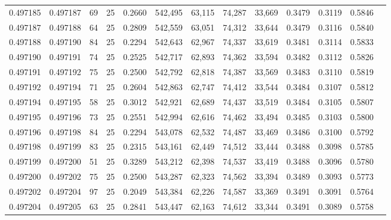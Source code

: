 \begin{tabular}{rrrrrrrrrrrrr}
0.497185 & 0.497187 &    69 &  25 &                                     0.2660 & 542,495 &  63,115 &  74,287 &  33,669 & 0.3479 & 0.3119 & 0.5846 \\
0.497187 & 0.497188 &    64 &  25 &                                     0.2809 & 542,559 &  63,051 &  74,312 &  33,644 & 0.3479 & 0.3116 & 0.5840 \\
0.497188 & 0.497190 &    84 &  25 &                                     0.2294 & 542,643 &  62,967 &  74,337 &  33,619 & 0.3481 & 0.3114 & 0.5833 \\
0.497190 & 0.497191 &    74 &  25 &                                     0.2525 & 542,717 &  62,893 &  74,362 &  33,594 & 0.3482 & 0.3112 & 0.5826 \\
0.497191 & 0.497192 &    75 &  25 &                                     0.2500 & 542,792 &  62,818 &  74,387 &  33,569 & 0.3483 & 0.3110 & 0.5819 \\
0.497192 & 0.497194 &    71 &  25 &                                     0.2604 & 542,863 &  62,747 &  74,412 &  33,544 & 0.3484 & 0.3107 & 0.5812 \\
0.497194 & 0.497195 &    58 &  25 &                                     0.3012 & 542,921 &  62,689 &  74,437 &  33,519 & 0.3484 & 0.3105 & 0.5807 \\
0.497195 & 0.497196 &    73 &  25 &                                     0.2551 & 542,994 &  62,616 &  74,462 &  33,494 & 0.3485 & 0.3103 & 0.5800 \\
0.497196 & 0.497198 &    84 &  25 &                                     0.2294 & 543,078 &  62,532 &  74,487 &  33,469 & 0.3486 & 0.3100 & 0.5792 \\
0.497198 & 0.497199 &    83 &  25 &                                     0.2315 & 543,161 &  62,449 &  74,512 &  33,444 & 0.3488 & 0.3098 & 0.5785 \\
0.497199 & 0.497200 &    51 &  25 &                                     0.3289 & 543,212 &  62,398 &  74,537 &  33,419 & 0.3488 & 0.3096 & 0.5780 \\
0.497200 & 0.497202 &    75 &  25 &                                     0.2500 & 543,287 &  62,323 &  74,562 &  33,394 & 0.3489 & 0.3093 & 0.5773 \\
0.497202 & 0.497204 &    97 &  25 &                                     0.2049 & 543,384 &  62,226 &  74,587 &  33,369 & 0.3491 & 0.3091 & 0.5764 \\
0.497204 & 0.497205 &    63 &  25 &                                     0.2841 & 543,447 &  62,163 &  74,612 &  33,344 & 0.3491 & 0.3089 & 0.5758 \\

\end{tabular}
